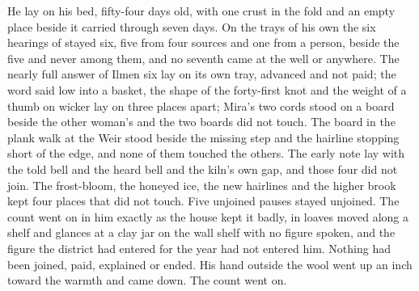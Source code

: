 He lay on his bed, fifty-four days old, with one crust in the fold and an empty place beside it carried through seven days. On the trays of his own the six hearings of  stayed six, five from four sources and one from a person, beside the five and never among them, and no seventh came at the well or anywhere. The nearly full answer of Ilmen six lay on its own tray, advanced and not paid; the word said low into a basket, the shape of the forty-first knot and the weight of a thumb on wicker lay on three places apart; Mira's two cords stood on a board beside the other woman's  and the two boards did not touch. The board in the plank walk at the Weir stood beside the missing step and the hairline stopping short of the edge, and none of them touched the others. The early note lay with the told bell and the heard bell and the kiln's own gap, and those four did not join. The frost-bloom, the honeyed ice, the new hairlines and the higher brook kept four places that did not touch. Five unjoined pauses stayed unjoined. The count went on in him exactly as the house kept it badly, in loaves moved along a shelf and glances at a clay jar on the wall shelf with no figure spoken, and the figure the district had entered for the year had not entered him. Nothing had been joined, paid, explained or ended. His hand outside the wool went up an inch toward the warmth and came down. The count went on.
